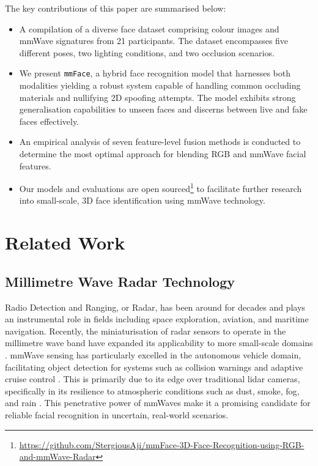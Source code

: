 \documentclass{mpaper}
\begin{document}
The key contributions of this paper are summarised below:
\vspace{-0.48cm}
\begin{itemize}
    \itemsep 0.08cm
    \item A compilation of a diverse face dataset comprising colour images and mmWave signatures from 21 participants. The dataset encompasses five different poses, two lighting conditions, and two occlusion scenarios.
    \item We present \texttt{mmFace}, a hybrid face recognition model that harnesses both modalities yielding a robust system capable of handling common occluding materials and nullifying 2D spoofing attempts. The model exhibits strong generalisation capabilities to unseen faces and discerns between live and fake faces effectively.
    \item An empirical analysis of seven feature-level fusion methods is conducted to determine the most optimal approach for blending RGB and mmWave facial features.
    \item Our models and evaluations are open sourced\footnote{\url{https://github.com/StergiousAji/mmFace-3D-Face-Recognition-using-RGB-and-mmWave-Radar}} to facilitate further research into small-scale, 3D face identification using mmWave technology.
\end{itemize}
\vspace{1pt}



\section{Related Work}
\subsection{Millimetre Wave Radar Technology}
Radio Detection and Ranging, or Radar, has been around for decades and plays an instrumental role in fields including space exploration, aviation, and maritime navigation. Recently, the miniaturisation of radar sensors to operate in the millimetre wave band have expanded its applicability to more small-scale domains \cite{soumya2023recent}. mmWave sensing has particularly excelled in the autonomous vehicle domain, facilitating object detection for systems such as collision warnings and adaptive cruise control \cite{dfrobot}. This is primarily due to its edge over traditional lidar cameras, specifically in its resilience to atmospheric conditions such as dust, smoke, fog, and rain \cite{cadenceblog2022}. This penetrative power of mmWaves make it a promising candidate for reliable facial recognition in uncertain, real-world scenarios. 
\end{document}
